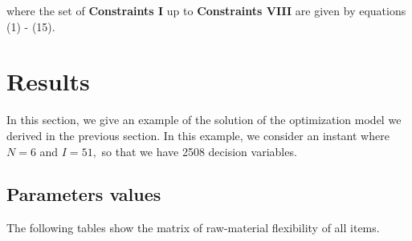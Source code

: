 \documentclass[preprint, 3p,
authoryear]{elsarticle} %
\begin{document}
where the set of \textbf{Constraints I} up to \textbf{Constraints VIII}
are given by equations (1) - (15).

\hypertarget{results}{%
\section{Results}\label{results}}

In this section, we give an example of the solution of the optimization
model we derived in the previous section. In this example, we consider
an instant where \(N=6\) and \(I=51,\) so that we have 2508 decision
variables.

\hypertarget{parameters-values}{%
\subsection{Parameters values}\label{parameters-values}}

The following tables show the matrix of raw-material flexibility of all
items.
\end{document}
